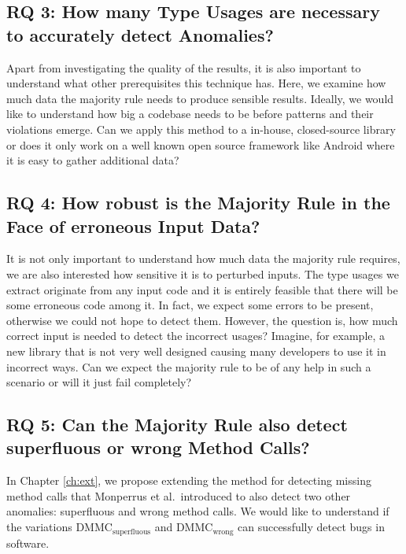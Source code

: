 \subsection{RQ 3: How many Type Usages are necessary to accurately detect Anomalies?}

Apart from investigating the quality of the results, it is also important to understand what other prerequisites this technique has.
Here, we examine how much data the majority rule needs to produce sensible results.
Ideally, we would like to understand how big a codebase needs to be before patterns and their violations emerge.
Can we apply this method to a in-house, closed-source library or does it only work on a well known open source framework like Android where it is easy to gather additional data?

\subsection{RQ 4: How robust is the Majority Rule in the Face of erroneous Input Data?}


It is not only important to understand how much data the majority rule requires, we are also interested how sensitive it is to perturbed inputs.
The type usages we extract originate from any input code and it is entirely feasible that there will be some erroneous code among it.
In fact, we expect some errors to be present, otherwise we could not hope to detect them.
However, the question is, how much correct input is needed to detect the incorrect usages?
Imagine, for example, a new library that is not very well designed causing many developers to use it in incorrect ways.
Can we expect the majority rule to be of any help in such a scenario or will it just fail completely?

\subsection{RQ 5: Can the Majority Rule also detect superfluous or wrong Method Calls?}

In Chapter \ref{ch:ext}, we propose extending the method for detecting missing method calls that Monperrus et al.\ introduced to also detect two other anomalies: superfluous and wrong method calls.
We would like to understand if the variations $\text{DMMC}_\text{superfluous}$ and $\text{DMMC}_\text{wrong}$ can successfully detect bugs in software.

